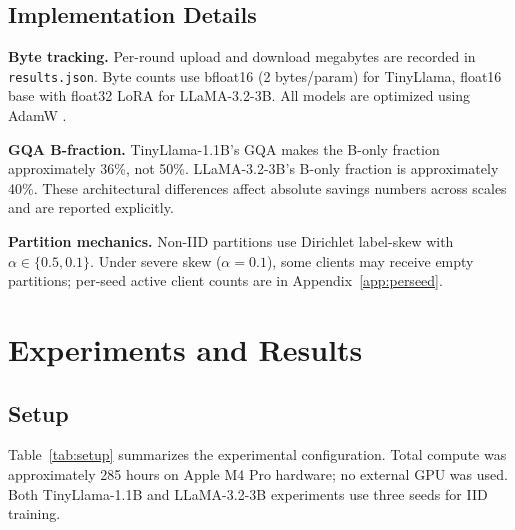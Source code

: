 \subsection{Implementation Details}
\textbf{Byte tracking.}
Per-round upload and download megabytes are recorded in \texttt{results.json}. Byte counts use bfloat16 (2 bytes/param) for TinyLlama, float16 base with float32 LoRA for LLaMA-3.2-3B. All models are optimized using AdamW \citep{loshchilov2019decoupled}.

\textbf{GQA B-fraction.}
TinyLlama-1.1B's GQA makes the B-only fraction approximately 36\%, not 50\%. LLaMA-3.2-3B's B-only fraction is approximately 40\%. These architectural differences affect absolute savings numbers across scales and are reported explicitly.

\textbf{Partition mechanics.}
Non-IID partitions use Dirichlet label-skew with $\alpha \in \{0.5, 0.1\}$. Under severe skew ($\alpha{=}0.1$), some clients may receive empty partitions; per-seed active client counts are in Appendix~\ref{app:perseed}.

\section{Experiments and Results}
\label{sec:experiments}

\subsection{Setup}
Table~\ref{tab:setup} summarizes the experimental configuration. Total compute was approximately 285 hours on Apple M4 Pro hardware; no external GPU was used. Both TinyLlama-1.1B and LLaMA-3.2-3B experiments use three seeds for IID training.

